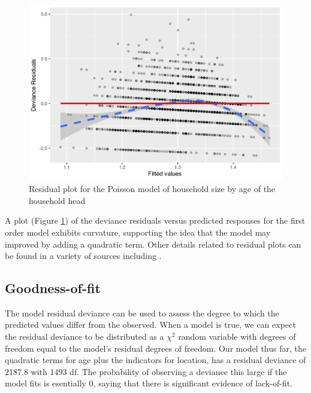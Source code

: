 \documentclass[
]{krantz}
\newenvironment{Shaded}{\begin{snugshade}}{\end{snugshade}}
\newcommand{\CommentTok}[1]{\textcolor[rgb]{0.37,0.37,0.37}{\textit{#1}}}
\newcommand{\DecValTok}[1]{\textcolor[rgb]{0.06,0.06,0.06}{#1}}
\newcommand{\KeywordTok}[1]{\textcolor[rgb]{0.27,0.27,0.27}{\textbf{#1}}}
\newcommand{\NormalTok}[1]{#1}
\newcommand{\OperatorTok}[1]{\textcolor[rgb]{0.43,0.43,0.43}{\textbf{#1}}}
\begin{document}
\begin{figure}

{\centering \includegraphics[width=0.6\linewidth]{bookdown-BeyondMLR_files/figure-latex/resid1-1} 

}

\caption{Residual plot for the Poisson model of household size by age of the household head}\label{fig:resid1}
\end{figure}

A plot (Figure \ref{fig:resid1}) of the deviance residuals versus predicted responses for the first order model exhibits curvature, supporting the idea that the model may improved by adding a quadratic term. Other details related to residual plots can be found in a variety of sources including \citet{McCullagh1989}.

\hypertarget{sec-PoisGOF}{%
\subsection{Goodness-of-fit}\label{sec-PoisGOF}}

The model residual deviance can be used to assess the degree to which the predicted values differ from the observed. When a model is true, we can expect the residual deviance to be distributed as a \(\chi^2\) random variable with degrees of freedom equal to the model's residual degrees of freedom. Our model thus far, the quadratic terms for age plus the indicators for location, has a residual deviance of 2187.8 with 1493 df. The probability of observing a deviance this large if the model fits is esentially 0, saying that there is significant evidence of lack-of-fit.

\begin{Shaded}
\end{Shaded}
\end{document}
